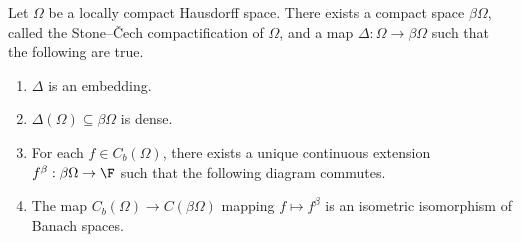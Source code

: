 \documentclass[10pt]{mypackage}
\begin{document}
\begin{theorem}
  Let $\Omega$ be a locally compact Hausdorff space. There exists a compact space $\beta\Omega$, called the Stone--Čech compactification of $\Omega$, and a map $\Delta: \Omega\rightarrow \beta\Omega$ such that the following are true.
  \begin{enumerate}[(1)]
    \item $\Delta$ is an embedding.
    \item $\Delta\left(\Omega\right)\subseteq \beta\Omega$ is dense.
    \item For each $f\in C_{b}\left(\Omega\right)$, there exists a unique continuous extension $f^{\beta}: \beta\Omega\rightarrow \F$ such that the following diagram commutes.
      \begin{center}
      \end{center}
    \item The map $C_b\left(\Omega\right)\rightarrow C\left(\beta\Omega\right)$ mapping $f\mapsto f^{\beta}$ is an isometric isomorphism of Banach spaces.
  \end{enumerate}
\end{theorem}
\end{document}
